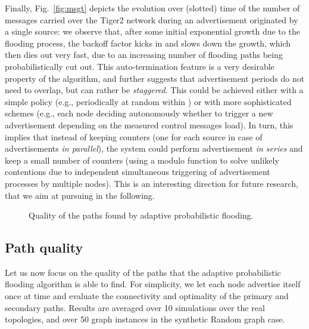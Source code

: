 \documentclass[conference]{IEEEtran}
\begin{document}
Finally, Fig.~\ref{fig:msgt} depicts the evolution over (slotted) time of the number of messages carried over the Tiger2 network during an advertisement originated by a single source: we observe that, after some initial exponential growth due to the flooding process, the backoff factor kicks in and slows down the growth, which then dies out very fast, due to an increasing number of flooding paths being probabilistically cut out. This auto-termination feature is a very desirable property of the algorithm, and further suggests that advertisement periods do not need to overlap, but can rather be \emph{staggered}.
This could be achieved either with a simple policy (e.g., periodically at random within ) or with more sophisticated schemes (e.g., each node deciding autonomously whether to trigger a new advertisement depending on the measured control messages load).  In turn, this implies that instead of keeping  counters (one for each source in case of advertisements \emph{in parallel}), the system could perform advertisement \emph{in series} and keep a small number of  counters (using a modulo function to solve unlikely contentions due to independent simultaneous triggering of advertisement processes by multiple nodes). This is an interesting direction for future research, that we aim at pursuing in the following.


\begin{figure*}[t]
\begin{center}
\caption{Quality of the paths found by adaptive probabilistic flooding.}
\end{center}
\end{figure*}
 
 
\subsection{Path quality}\label{sec:Experiments}
Let us now focus on the quality of the paths that the adaptive probabilistic flooding algorithm is able to find. For simplicity, we let each node advertise itself once at time  and evaluate the connectivity and optimality of the primary and secondary paths. Results are averaged over 10 simulations over the real topologies, and over 50 graph instances in the synthetic Random graph case.
\end{document}
